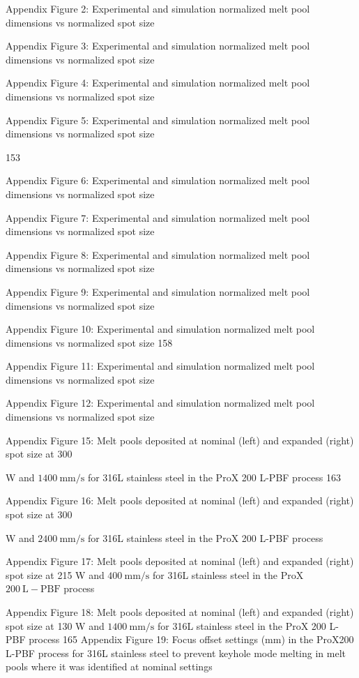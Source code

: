 \documentclass[10pt]{article}
\begin{document}
Appendix Figure 2: Experimental and simulation normalized melt pool dimensions vs normalized spot size

Appendix Figure 3: Experimental and simulation normalized melt pool dimensions vs normalized spot size

Appendix Figure 4: Experimental and simulation normalized melt pool dimensions vs normalized spot size

Appendix Figure 5: Experimental and simulation normalized melt pool dimensions vs normalized spot size

153

Appendix Figure 6: Experimental and simulation normalized melt pool dimensions vs normalized spot size

Appendix Figure 7: Experimental and simulation normalized melt pool dimensions vs normalized spot size

Appendix Figure 8: Experimental and simulation normalized melt pool dimensions vs normalized spot size

Appendix Figure 9: Experimental and simulation normalized melt pool dimensions vs normalized spot size

Appendix Figure 10: Experimental and simulation normalized melt pool dimensions vs normalized spot size 158

Appendix Figure 11: Experimental and simulation normalized melt pool dimensions vs normalized spot size

Appendix Figure 12: Experimental and simulation normalized melt pool dimensions vs normalized spot size

Appendix Figure 15: Melt pools deposited at nominal (left) and expanded (right) spot size at 300

W and $1400 \mathrm{~mm} / \mathrm{s}$ for 316L stainless steel in the ProX 200 L-PBF process 163

Appendix Figure 16: Melt pools deposited at nominal (left) and expanded (right) spot size at 300

W and $2400 \mathrm{~mm} / \mathrm{s}$ for 316L stainless steel in the ProX 200 L-PBF process

Appendix Figure 17: Melt pools deposited at nominal (left) and expanded (right) spot size at 215 W and $400 \mathrm{~mm} / \mathrm{s}$ for 316L stainless steel in the ProX $200 \mathrm{~L}-\mathrm{PBF}$ process

Appendix Figure 18: Melt pools deposited at nominal (left) and expanded (right) spot size at 130 W and $1400 \mathrm{~mm} / \mathrm{s}$ for 316L stainless steel in the ProX 200 L-PBF process 165 Appendix Figure 19: Focus offset settings (mm) in the ProX200 L-PBF process for 316L stainless steel to prevent keyhole mode melting in melt pools where it was identified at nominal settings
\end{document}
